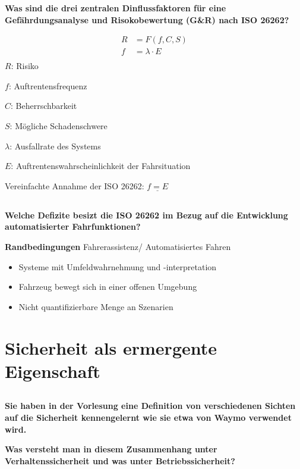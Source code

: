 \textbf{Was sind die drei zentralen Dinflussfaktoren für eine Gefährdungsanalyse und Risokobewertung (G\&R) nach ISO 26262?}

\begin{equation}
    \begin{array}{cc}
        R & =F(f,C,S)       \\
        f & =\lambda\cdot E \\
    \end{array}
\end{equation}
$R$: Risiko

$f$: Auftrentensfrequenz

$C$: Beherrschbarkeit

$S$: Mögliche Schadenschwere

$\lambda$: Ausfallrate des Systems

$E$: Auftrentenswahrscheinlichkeit der Fahrsituation

Vereinfachte Annahme der ISO 26262: $\underline{f=E}$

\subsection{}
\textbf{Welche Defizite besizt die ISO 26262 im Bezug auf die Entwicklung automatisierter Fahrfunktionen?}

\textbf{Randbedingungen} Fahrerassistenz/ Automatisiertes Fahren
\begin{itemize}
    \item Systeme mit Umfeldwahrnehmung und -interpretation
    \item Fahrzeug bewegt sich in einer offenen Umgebung
    \item Nicht quantifizierbare Menge an Szenarien
\end{itemize}

\section{Sicherheit als ermergente Eigenschaft}
\subsection{}
\textbf{Sie haben in der Vorlesung eine Definition von verschiedenen Sichten auf die Sicherheit kennengelernt wie sie etwa von Waymo verwendet wird.}

\textbf{Was versteht man in diesem Zusammenhang unter Verhaltenssicherheit und was unter Betriebssicherheit?}